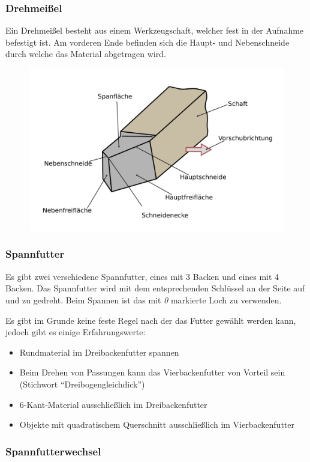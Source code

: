 \documentclass{\basedir/fablab-document}
\begin{document}
\newpage
\subsubsection{Drehmeißel}
Ein Drehmeißel besteht aus einem Werkzeugschaft, welcher fest in der Aufnahme befestigt ist. Am vorderen Ende befinden sich die Haupt- und Nebenschneide durch welche das Material
abgetragen wird.
\begin{figure}[ht]
\centering
\includegraphics[width = 0.75\linewidth]{img/drehmeissel}
\end{figure}

\subsubsection{Spannfutter}

Es gibt zwei verschiedene Spannfutter, eines mit 3 Backen und eines mit 4 Backen. Das Spannfutter wird mit dem entsprechenden Schlüssel an der Seite auf und zu gedreht. Beim Spannen ist das mit \emph{0} markierte Loch zu verwenden.

Es gibt im Grunde keine feste Regel nach der das Futter gewählt werden kann, jedoch gibt es einige Erfahrungswerte:
\begin{itemize} 
\item Rundmaterial im Dreibackenfutter spannen
\item Beim Drehen von Passungen kann das Vierbackenfutter von Vorteil sein (Stichwort \enquote{Dreibogengleichdick})
\item 6-Kant-Material ausschließlich im Dreibackenfutter
\item Objekte mit quadratischem Querschnitt ausschließlich im Vierbackenfutter
\end{itemize}

\subsubsection{Spannfutterwechsel}
\end{document}
